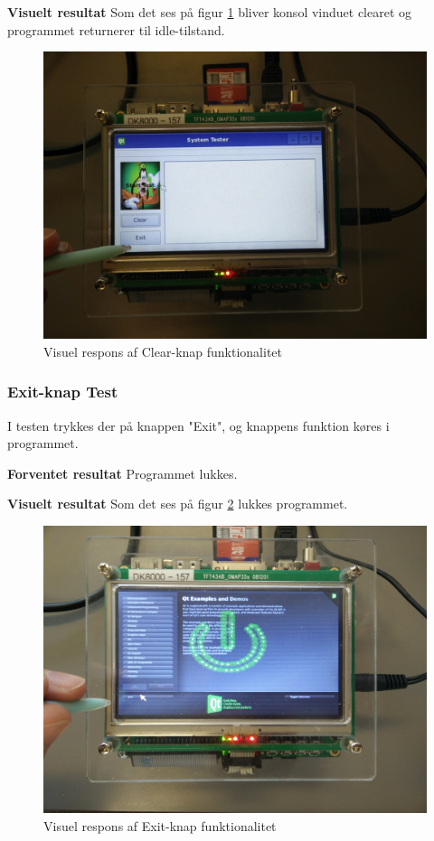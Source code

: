 \noindent\textbf{Visuelt resultat}\newline
\noindent Som det ses på figur \ref{fig:GUIClear} bliver konsol vinduet clearet og programmet returnerer til idle-tilstand.\newline

\begin{figure}[H]
	\centering
	\includegraphics[width=.5\textwidth]{Test/images/GUITest/TestClear.jpg}
	\caption{Visuel respons af Clear-knap funktionalitet}
	\label{fig:GUIClear}
\end{figure}

\subsubsection{Exit-knap Test}
I testen trykkes der på knappen "Exit", og knappens funktion køres i programmet.\newline

\noindent\textbf{Forventet resultat}\newline
\noindent Programmet lukkes.\newline

\noindent\textbf{Visuelt resultat}\newline
Som det ses på figur \ref{fig:GUIExit} lukkes programmet.

\begin{figure}[H]
	\centering
	\includegraphics[width=.5\textwidth]{Test/images/GUITest/TestExit.jpg}
	\caption{Visuel respons af Exit-knap funktionalitet}
	\label{fig:GUIExit}
\end{figure}

